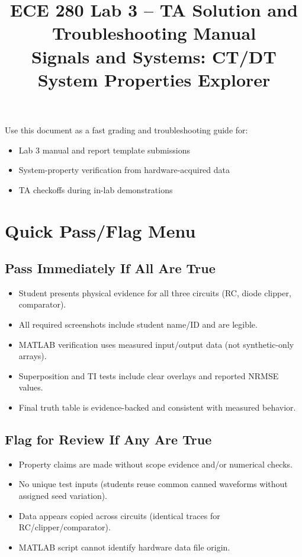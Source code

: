 \documentclass[11pt,letterpaper]{article}
\title{ECE 280 Lab 3 -- TA Solution and Troubleshooting Manual\\Signals and Systems: CT/DT System Properties Explorer}
\author{}
\date{}
\begin{document}
\maketitle

Use this document as a fast grading and troubleshooting guide for:
\begin{itemize}[leftmargin=1.2em]
    \item Lab 3 manual and report template submissions
    \item System-property verification from hardware-acquired data
    \item TA checkoffs during in-lab demonstrations
\end{itemize}

\section{Quick Pass/Flag Menu}

\subsection*{Pass Immediately If All Are True}
\begin{itemize}[leftmargin=1.2em]
    \item Student presents physical evidence for all three circuits (RC, diode clipper, comparator).
    \item All required screenshots include student name/ID and are legible.
    \item MATLAB verification uses measured input/output data (not synthetic-only arrays).
    \item Superposition and TI tests include clear overlays and reported NRMSE values.
    \item Final truth table is evidence-backed and consistent with measured behavior.
\end{itemize}

\subsection*{Flag for Review If Any Are True}
\begin{itemize}[leftmargin=1.2em]
    \item Property claims are made without scope evidence and/or numerical checks.
    \item No unique test inputs (students reuse common canned waveforms without assigned seed variation).
    \item Data appears copied across circuits (identical traces for RC/clipper/comparator).
    \item MATLAB script cannot identify hardware data file origin.
\end{itemize}
\end{document}
